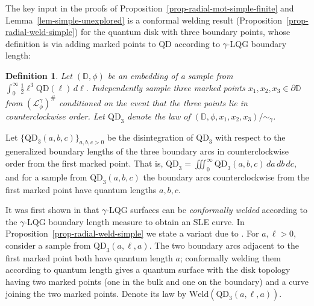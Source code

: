 \documentclass[a4paper]{article}
\numberwithin{equation}{section}
\newcommand{\D}{\mathbb{D}}
\newcommand{\cL}{\mathcal{L}}
\newcommand{\QD}{\mathrm{QD}}
\newtheorem{definition}[theorem]{Definition}
\theoremstyle{remark}
\numberwithin{equation}{section}
\begin{document}
The key input in the proofs of Proposition~\ref{prop-radial-mot-simple-finite} and Lemma~\ref{lem-simple-unexplored} is a conformal welding result (Proposition~\ref{prop-radial-weld-simple}) for the quantum disk with three boundary points, whose definition is via adding marked points to $\QD$ according to $\gamma$-LQG boundary length:

\begin{definition}\label{def-qd3}
    Let $(\D, \phi)$ be an embedding of a sample from $\int_0^\infty \frac12 \ell^3 \QD(\ell) \, d\ell$. Independently sample three marked points $x_1, x_2, x_3 \in \partial \D$ from $(\cL^\gamma_\phi)^\#$ conditioned on the event that the three points lie in counterclockwise order. Let $\QD_3$ denote the law of $(\D, \phi, x_1, x_2, x_3)/{\sim_\gamma}$.
\end{definition}
Let $\{ \QD_3(a,b,c)\}_{a,b,c >0}$ be the disintegration of $ \QD_3$ with respect to the generalized boundary lengths of the three boundary arcs in counterclockwise order from the first marked point. That is, $ \QD_3 = \iiint_0^\infty  \QD_3(a,b,c) \, da \, db\, dc$, and for a sample from $\QD_3(a,b,c)$ the boundary arcs counterclockwise from the first marked point have quantum lengths $a,b,c$. 

It was first shown in \cite{shef-zipper} that $\gamma$-LQG surfaces can be \emph{conformally welded} according to the $\gamma$-LQG boundary length measure to obtain an SLE curve. In Proposition~\ref{prop-radial-weld-simple} we state a variant due to \cite{ay-radial}. For $a,\ell > 0$, consider a sample from $ \QD_3(a,\ell,a)$. The two boundary arcs adjacent to the first marked point both have quantum length $a$; conformally welding them according to quantum length gives a quantum surface with the disk topology having two marked points (one in the bulk and one on the boundary) and a curve joining the two marked points. Denote its law by $\mathrm{Weld}( \QD_3(a,\ell, a))$. 
\end{document}
